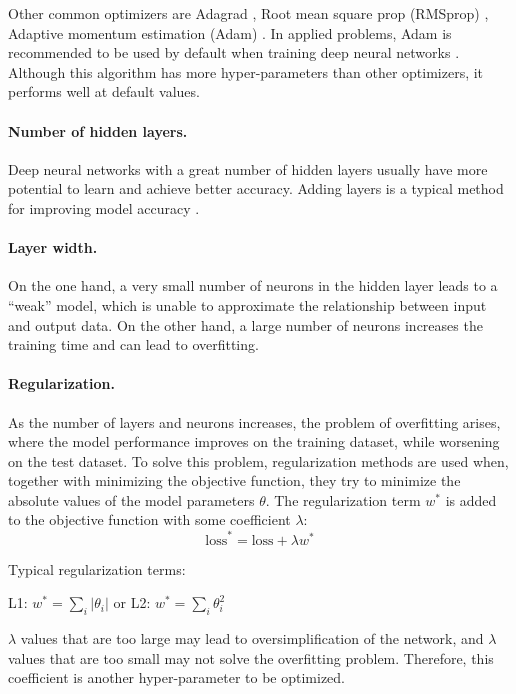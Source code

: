 \documentclass[reprint,
superscriptaddress,
amsmath,amssymb,aps,showkeys,showpacs,
twoside,final,secnumarabic,%
nofootinbib]{revtex4-2}
\begin{document}
Other common optimizers are Adagrad \cite{bib16}, Root mean square prop (RMSprop) \cite{bib17}, Adaptive momentum estimation (Adam) \cite{bib18}. In applied problems, Adam is recommended to be used by default when training deep neural networks \cite{bib19}. Although this algorithm has more hyper-parameters than other optimizers, it performs well at default values.

\paragraph*{Number of hidden layers.}
Deep neural networks with a great number of hidden layers usually have more potential to learn and achieve better accuracy. Adding layers is a typical method for improving model accuracy \cite{bib20}.

\paragraph*{Layer width.}
On the one hand, a very small number of neurons in the hidden layer leads to a “weak” model, which is unable to approximate the relationship between input and output data. On the other hand, a large number of neurons increases the training time and can lead to overfitting.

\paragraph*{Regularization.}
As the number of layers and neurons increases, the problem of overfitting arises, where the model performance improves on the training dataset, while worsening on the test dataset. To solve this problem, regularization methods are used when, together with minimizing the objective function, they try to minimize the absolute values of the model parameters $\theta$. The regularization term $w^\ast$ is added to the objective function with some coefficient $\lambda$:
\[\mathrm{loss}^\ast = \mathrm{loss} + \lambda w^\ast\]

Typical regularization terms:
\begin{center}
L1: $w^\ast = \sum \limits_i |\theta_i|$ \quad or \quad L2: $w^\ast = \sum \limits_i \theta_i^2$
\end{center}

$\lambda$ values that are too large may lead to oversimplification of the network, and $\lambda$ values that are too small may not solve the overfitting problem. Therefore, this coefficient is another hyper-parameter to be optimized.
\end{document}
